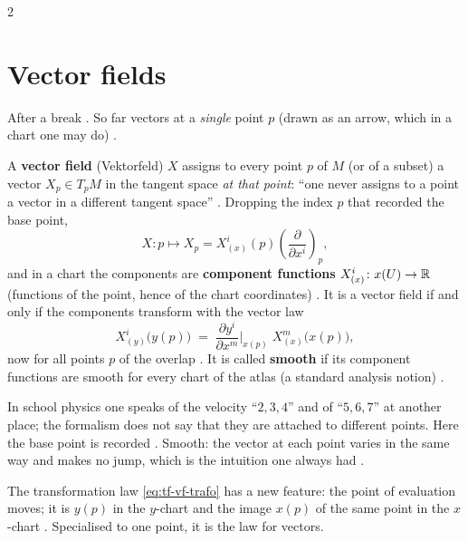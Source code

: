 \begin{paracol}{2}
\section{Vector fields}\label{sec:tf-vector-fields}

After a break . So far vectors at a \emph{single} point $p$ (drawn as an arrow, which in a chart one may do)
.

\begin{definition}\label{def:tf-vectorfield}
A \textbf{vector field} (Vektorfeld) $X$ assigns to every point $p$ of $M$ (or of a subset) a vector $X_p\in T_pM$ in the tangent
space \emph{at that point}: ``one never assigns to a point a vector in a different tangent space''
. Dropping the index $p$ that recorded the base point,
\[
  X\colon p\mapsto X_p=X^i_{(x)}(p)\left(\frac{\partial}{\partial x^i}\right)_{\!p},
\]
and in a chart the components are \textbf{component functions} $X^i_{(x)}\colon x(U)\to\mathbb{R}$ (functions of the point, hence of
the chart coordinates) .
It is a vector field if and only if the components transform with the vector law
\begin{equation}\label{eq:tf-vf-trafo}
  X^i_{(y)}\bigl(y(p)\bigr)\;=\;\frac{\partial y^i}{\partial x^m}\Big|_{x(p)}\;X^m_{(x)}\bigl(x(p)\bigr),
\end{equation}
now for all points $p$ of the overlap .
It is called \textbf{smooth} if its component functions are smooth for every chart of the atlas (a standard analysis notion)
.
\end{definition}
\begin{intuition}
In school physics one speaks of the velocity ``$2,3,4$'' and of ``$5,6,7$'' at another place; the formalism does not say that
they are attached to different points. Here the base point is recorded .
Smooth: the vector at each point varies in the same way and makes no jump, which is the intuition one always had
.
\end{intuition}
The transformation law \eqref{eq:tf-vf-trafo} has a new feature: the point of evaluation moves; it is $y(p)$ in the $y$-chart and
the image $x(p)$ of the same point in the $x$-chart . Specialised to one point, it is the law
for vectors.


\end{paracol}
